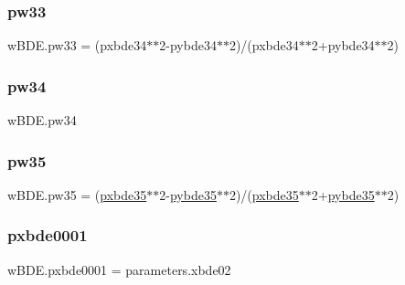 \mbox{\label{namespacewBDE_a1c44a143c96f2bf9ec07050d9b49a747}} 
\subsubsection{\texorpdfstring{pw33}{pw33}}
{\footnotesize\ttfamily w\+B\+D\+E.\+pw33 = (pxbde34$\ast$$\ast$2-\/pybde34$\ast$$\ast$2)/(pxbde34$\ast$$\ast$2+pybde34$\ast$$\ast$2)}

\mbox{\label{namespacewBDE_a66b08b6bf6c9b97a79c1948e00acbe10}} 
\subsubsection{\texorpdfstring{pw34}{pw34}}
{\footnotesize\ttfamily w\+B\+D\+E.\+pw34}

\mbox{\label{namespacewBDE_a3d2638469853dcc57314cb3c96c37c44}} 
\subsubsection{\texorpdfstring{pw35}{pw35}}
{\footnotesize\ttfamily w\+B\+D\+E.\+pw35 = (\mbox{\hyperlink{namespacewBDE_a191d448c5a5e490e61328d7f371c7f33}{pxbde35}}$\ast$$\ast$2-\/\mbox{\hyperlink{namespacewBDE_a37997e956a6d587ae1d2400ce7873da8}{pybde35}}$\ast$$\ast$2)/(\mbox{\hyperlink{namespacewBDE_a191d448c5a5e490e61328d7f371c7f33}{pxbde35}}$\ast$$\ast$2+\mbox{\hyperlink{namespacewBDE_a37997e956a6d587ae1d2400ce7873da8}{pybde35}}$\ast$$\ast$2)}

\mbox{\label{namespacewBDE_a3364caa4a71712e896caa616959a9d0a}} 
\subsubsection{\texorpdfstring{pxbde0001}{pxbde0001}}
{\footnotesize\ttfamily w\+B\+D\+E.\+pxbde0001 = parameters.\+xbde02}

\mbox{\label{namespacewBDE_a8b2addd591e7cc71e403791326d90ee7}} 
